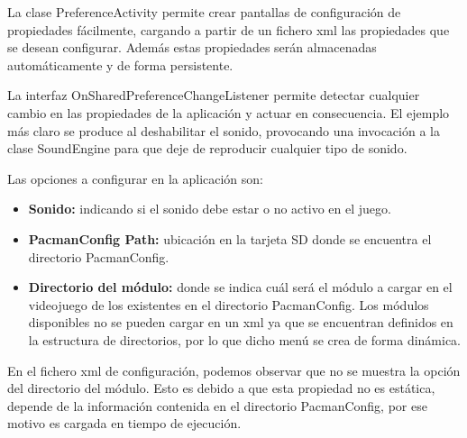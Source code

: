La clase PreferenceActivity permite crear pantallas de configuración de propiedades fácilmente, cargando a partir de un fichero xml las propiedades que se desean configurar. Además estas propiedades serán almacenadas automáticamente y de forma persistente.
\newline

La interfaz  OnSharedPreferenceChangeListener permite detectar cualquier cambio en las propiedades de la aplicación y actuar en consecuencia. El ejemplo más claro se produce al deshabilitar el sonido, provocando una invocación a la clase SoundEngine para que deje de reproducir cualquier tipo de sonido.
\newline

Las opciones a configurar en la aplicación son:
\begin{itemize}
\item \textbf{Sonido:} indicando si el sonido debe estar o no activo en el juego.
\item \textbf{PacmanConfig Path:} ubicación en la tarjeta SD donde se encuentra el directorio PacmanConfig.
\item \textbf{Directorio del módulo:} donde se indica cuál será el módulo a cargar en el videojuego de los existentes en el directorio PacmanConfig. Los módulos disponibles no se pueden cargar en un xml ya que se encuentran definidos en la estructura de directorios, por lo que dicho menú se crea de forma dinámica.
\end{itemize}

\vspace{2mm}

En el fichero xml de configuración, podemos observar que no se muestra la opción del directorio del módulo. Esto es debido a que esta propiedad no es estática, depende de la información contenida en el directorio PacmanConfig, por ese motivo es cargada en tiempo de ejecución.

